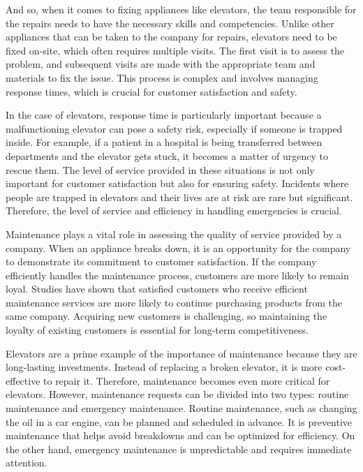 
And so, when it comes to fixing appliances like elevators, the team
responsible for the repairs needs to have the necessary skills and
competencies. Unlike other appliances that can be taken to the company
for repairs, elevators need to be fixed on-site, which often requires
multiple visits. The first visit is to assess the problem, and
subsequent visits are made with the appropriate team and materials to
fix the issue. This process is complex and involves managing response
times, which is crucial for customer satisfaction and safety.

In the case of elevators, response time is particularly important
because a malfunctioning elevator can pose a safety risk, especially if
someone is trapped inside. For example, if a patient in a hospital is
being transferred between departments and the elevator gets stuck, it
becomes a matter of urgency to rescue them. The level of service
provided in these situations is not only important for customer
satisfaction but also for ensuring safety. Incidents where people are
trapped in elevators and their lives are at risk are rare but
significant. Therefore, the level of service and efficiency in handling
emergencies is crucial.

Maintenance plays a vital role in assessing the quality of service
provided by a company. When an appliance breaks down, it is an
opportunity for the company to demonstrate its commitment to customer
satisfaction. If the company efficiently handles the maintenance
process, customers are more likely to remain loyal. Studies have shown
that satisfied customers who receive efficient maintenance services are
more likely to continue purchasing products from the same company.
Acquiring new customers is challenging, so maintaining the loyalty of
existing customers is essential for long-term competitiveness.

Elevators are a prime example of the importance of maintenance because
they are long-lasting investments. Instead of replacing a broken
elevator, it is more cost-effective to repair it. Therefore, maintenance
becomes even more critical for elevators. However, maintenance requests
can be divided into two types: routine maintenance and emergency
maintenance. Routine maintenance, such as changing the oil in a car
engine, can be planned and scheduled in advance. It is preventive
maintenance that helps avoid breakdowns and can be optimized for
efficiency. On the other hand, emergency maintenance is unpredictable
and requires immediate attention.

